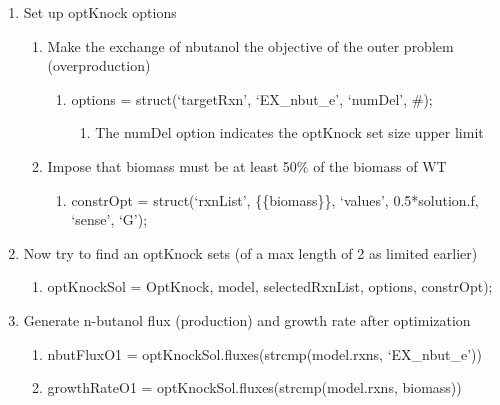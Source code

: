 \begin{enumerate} [noitemsep,topsep=0pt]
\begin{enumerate}[noitemsep,topsep=0pt]
\begin{enumerate}[noitemsep,topsep=0pt]
    \item nbutFlux = solution.x(strcmp(model.rxns, ‘EX\_nbut\_e’));
    \item growthRate = solution.f
\end{enumerate}
\end{enumerate}
\item Set up optKnock options
\begin{enumerate}[noitemsep,topsep=0pt]
\item Make the exchange of nbutanol the objective of the outer problem (overproduction)
\begin{enumerate}[noitemsep,topsep=0pt]
    \item options = struct(‘targetRxn’, ‘EX\_nbut\_e’, ‘numDel’, \#);
\begin{enumerate}[noitemsep,topsep=0pt]
    \item The numDel option indicates the optKnock set size upper limit
\end{enumerate}
\end{enumerate}
\item Impose that biomass must be at least 50\% of the biomass of WT
\begin{enumerate}[noitemsep,topsep=0pt]
    \item constrOpt = struct(‘rxnList’, \{\{biomass\}\}, ‘values’, 0.5*solution.f, ‘sense’, ‘G’);
\end{enumerate}
\end{enumerate}
\item Now try to find an optKnock sets (of a max length of 2 as limited earlier)
\begin{enumerate}[noitemsep,topsep=0pt]
    \item optKnockSol = OptKnock, model, selectedRxnList, options, constrOpt);
\end{enumerate}
\item Generate n-butanol flux (production) and growth rate after optimization
\begin{enumerate}[noitemsep,topsep=0pt]
\item nbutFluxO1 = optKnockSol.fluxes(strcmp(model.rxns, ‘EX\_nbut\_e’))
\item growthRateO1 = optKnockSol.fluxes(strcmp(model.rxns, biomass))
\end{enumerate}
\end{enumerate}
